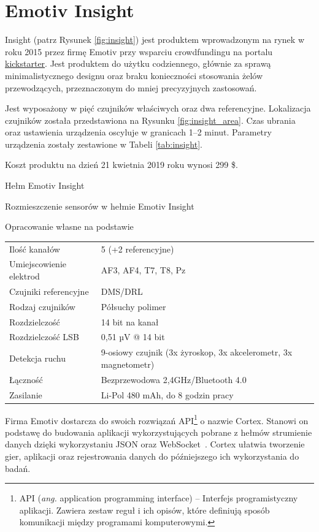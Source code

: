 \documentclass[skorowidz,skroty]{dyplomWEZUT}
\begin{document}
\section{Emotiv Insight\label{section:insight}}
Insight (patrz Rysunek \vref{fig:insight}) jest produktem wprowadzonym na rynek w roku 2015 przez firmę Emotiv przy wsparciu crowdfundingu na portalu \href{www.kickstarter.com}{kickstarter}. Jest produktem do użytku codziennego, głównie za sprawą minimalistycznego designu oraz braku konieczności stosowania żelów przewodzących, przeznaczonym do mniej precyzyjnych zastosowań.

Jest wyposażony w pięć czujników właściwych oraz dwa referencyjne. Lokalizacja czujników została przedstawiona na Rysunku \vref{fig:insight_area}. Czas ubrania oraz ustawienia urządzenia oscyluje w granicach 1--2 minut. Parametry urządzenia zostały zestawione w Tabeli \vref{tab:insight}.

Koszt produktu na dzień 21 kwietnia 2019 roku wynosi 299 \$.

{Hełm Emotiv Insight\label{fig:insight}}
{\cite{emotiv_insight}}

{Rozmieszczenie sensorów w hełmie Emotiv Insight\label{fig:insight_area}}
{\cite{emotiv_insight}}

{Opracowanie własne na podstawie~\cite{emotiv_comparison}}
{
    \begin{tabular}{l|l}
        Ilość kanałów & 5 (+2 referencyjne)\\
        Umiejscowienie elektrod & AF3, AF4, T7, T8, Pz\\
        Czujniki referencyjne & DMS/DRL\\
        Rodzaj czujników & Półsuchy polimer\\
        Rozdzielczość & 14 bit na kanał\\
        Rozdzielczość LSB & 0,51 µV @ 14 bit\\
        Detekcja ruchu & 9-osiowy czujnik (3x żyroskop, 3x akcelerometr, 3x magnetometr)\\
        Łączność & Bezprzewodowa 2,4GHz/Bluetooth 4.0\\
        Zasilanie & Li-Pol 480 mAh, do 8 godzin pracy
    \end{tabular}
}

Firma Emotiv dostarcza do swoich rozwiązań API\footnote{API (\textit{ang.} application programming interface) -- Interfejs programistyczny aplikacji. Zawiera zestaw reguł i ich opisów, które definiują sposób komunikacji między programami komputerowymi.\label{foot:api}} o nazwie Cortex. Stanowi on podstawę do budowania aplikacji wykorzystujących pobrane z hełmów strumienie danych dzięki wykorzystaniu JSON oraz WebSocket~\cite{emotiv_developer}. Cortex ułatwia tworzenie gier, aplikacji oraz rejestrowania danych do późniejszego ich wykorzystania do badań.
\end{document}
